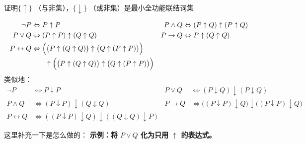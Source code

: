 \documentclass[lang=cn,11pt]{elegantbook}
\begin{document}
\begin{example}
    证明$\{\uparrow\}$ （与非集），$\{\downarrow\}$ （或非集）是最小全功能联结词集
\end{example}
\begin{solution}
\begin{align*}
    \neg P &\Leftrightarrow P \uparrow P &
    P \land Q &\Leftrightarrow (P \uparrow Q) \uparrow (P \uparrow Q) \\
    P \lor Q &\Leftrightarrow (P \uparrow P) \uparrow (Q \uparrow Q) &
    P \rightarrow Q &\Leftrightarrow P \uparrow (Q \uparrow Q) \\
    P \leftrightarrow Q &\Leftrightarrow \Bigl(\bigl(P \uparrow (Q \uparrow Q)\bigr) \uparrow \bigl(Q \uparrow (P \uparrow P)\bigr)\Bigr) \\
    &\qquad \uparrow \Bigl(\bigl(P \uparrow (Q \uparrow Q)\bigr) \uparrow \bigl(Q \uparrow (P \uparrow P)\bigr)\Bigr)
\end{align*}
类似地：
\begin{align*}
    \neg P &\Leftrightarrow P \downarrow P &
    P \lor Q &\Leftrightarrow (P \downarrow Q) \downarrow (P \downarrow Q) \\
    P \land Q &\Leftrightarrow (P \downarrow P) \downarrow (Q \downarrow Q) &
    P \rightarrow Q &\Leftrightarrow \bigl((P \downarrow P) \downarrow Q\bigr) \downarrow \bigl((P \downarrow P) \downarrow Q\bigr) \\
    P \leftrightarrow Q &\Leftrightarrow ((P \downarrow P) \downarrow Q) \downarrow ((Q \downarrow Q) \downarrow P)
\end{align*}
\end{solution}
这里补充一下是怎么做的：
\textbf{示例：将 $P \lor Q$ 化为只用 $\uparrow$ 的表达式。}
\end{document}
